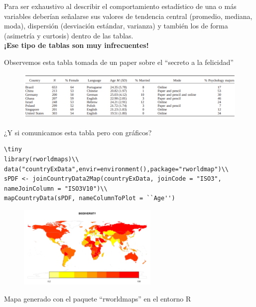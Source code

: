 \documentclass[aspectratio=169]{beamer}
\begin{document}
\begin{frame}
Para ser exhaustivo al describir el comportamiento estadístico de una o más variables deberían señalarse sus valores de tendencia central (promedio, mediana, moda), dispersión (desviación estándar, varianza) y también los de forma (asimetría y curtosis) dentro de las tablas. \\
\vspace{0.5cm}
\centering
\pause
\textbf{¡Ese tipo de tablas son muy infrecuentes!}    
\end{frame}


\begin{frame}
\Large
Observemos esta tabla tomada de un paper sobre el ``secreto a la felicidad'' \cite{Tamir2017}
\begin{figure}
\centering
 \includegraphics[width=1\textwidth]{Fig1}
\end{figure}
¿Y si comunicamos esta tabla pero con gráficos?
\end{frame}

\begin{frame}
\begin{verbatim}
\tiny
library(rworldmaps)\\
data("countryExData",envir=environment(),package="rworldmap")\\
sPDF <- joinCountryData2Map(countryExData, joinCode = "ISO3", nameJoinColumn = "ISO3V10")\\
mapCountryData(sPDF, nameColumnToPlot = ``Age'')
\end{verbatim}
\begin{figure}
\centering
 \includegraphics[width=0.6\textwidth]{Fig2}
\end{figure}
\tiny{Mapa generado con el paquete ``rworldmaps'' en el entorno R \cite{R2017}}
\end{frame}
\end{document}
